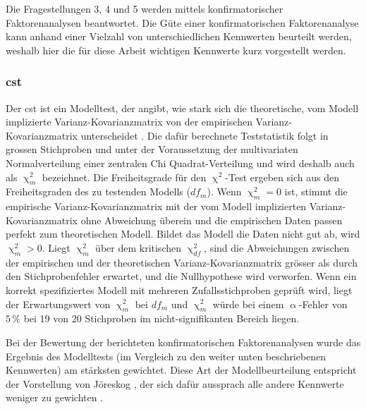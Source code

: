 \documentclass[11pt, twoside, a4paper]{book}		%
\begin{document}
Die Fragestellungen 3, 4 und 5 werden mittels konfirmatorischer Faktorenanalysen beantwortet. Die Güte einer konfirmatorischen Faktorenanalyse kann anhand einer Vielzahl von unterschiedlichen Kennwerten beurteilt werden, weshalb hier die für diese Arbeit wichtigen Kennwerte kurz vorgestellt werden.










\subsubsection*{\gls{cst}}

Der \gls{cst} ist ein Modelltest, der angibt, wie stark sich die theoretische, vom Modell implizierte Var\-ianz-Ko\-var\-ianz\-ma\-trix von der empirischen Var\-ianz-Ko\-var\-ianz\-ma\-trix unterscheidet \citep{Kline2011}. Die dafür berechnete Teststatistik folgt in grossen Stichproben und unter der Voraussetzung der multivariaten Normalverteilung einer zentralen Chi Quad\-rat-Ver\-teil\-ung und wird deshalb auch als $\upchi^2_{m}$ bezeichnet. Die Freiheitsgrade für den $\upchi^2$-Test ergeben sich aus den Freiheitsgraden des zu testenden Modells ($df_{m}$). Wenn $\upchi^2_{m}=0$ ist, stimmt die empirische Var\-ianz-Ko\-var\-ianz\-ma\-trix mit der vom Modell implizierten Varianz-Kovarianzmatrix ohne Abweichung überein und die empirischen Daten passen perfekt zum theoretischen Modell. Bildet das Modell die Daten nicht gut ab, wird $\upchi^2_{m}>0$. Liegt $\upchi^2_{m}$ über dem kritischen $\upchi^2_{df}$, sind die Abweichungen zwischen der empirischen und der theoretischen Varianz-Kovarianzmatrix grösser als durch den Stichprobenfehler erwartet, und die Nullhypothese wird verworfen. Wenn ein korrekt spezifiziertes Modell mit mehreren Zufallsstichproben geprüft wird, liegt der Erwartungswert von $\upchi^2_{m}$ bei $df_{m}$ und $\upchi^2_{m}$ würde bei einem $\upalpha$-Fehler von $5\,\%$ bei 19 von 20 Stichproben im nicht-signifikanten Bereich liegen.

Bei der Bewertung der berichteten konfirmatorischen Faktorenanalysen wurde das Ergebnis des Modelltests (im Vergleich zu den weiter unten beschriebenen Kennwerten) am stärksten gewichtet. Diese Art der Modellbeurteilung entspricht der Vorstellung von Jöreskog \citep[1985, zitiert nach][S. 1620]{McIntosh2012}, der sich dafür aussprach alle andere Kennwerte weniger zu gewichten \citep[siehe auch][]{Hayduk2007}.
\end{document}
